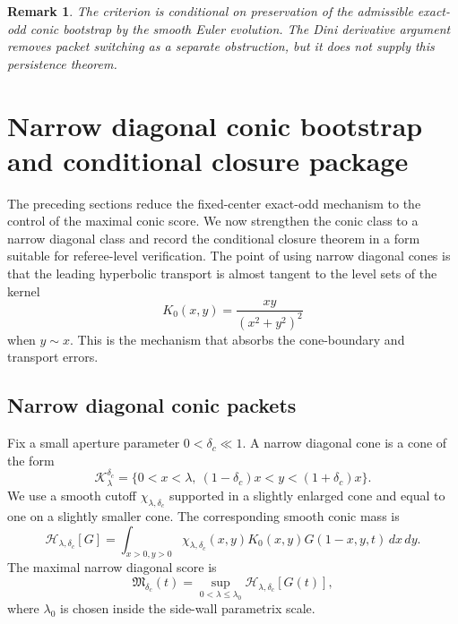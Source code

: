 \documentclass[11pt]{amsart}
\newtheorem{remark}[theorem]{Remark}
\begin{document}
\begin{remark}
The criterion is conditional on preservation of the admissible exact-odd conic bootstrap by the smooth Euler evolution.  The Dini derivative argument removes packet switching as a separate obstruction, but it does not supply this persistence theorem.
\end{remark}


\section{Narrow diagonal conic bootstrap and conditional closure package}\label{sec:finalclosure}

The preceding sections reduce the fixed-center exact-odd mechanism to the control of the maximal conic score.  We now strengthen the conic class to a narrow diagonal class and record the conditional closure theorem in a form suitable for referee-level verification.  The point of using narrow diagonal cones is that the leading hyperbolic transport is almost tangent to the level sets of the kernel
\[
K_0(x,y)=\frac{xy}{(x^2+y^2)^2}
\]
when \(y\sim x\).  This is the mechanism that absorbs the cone-boundary and transport errors.

\subsection{Narrow diagonal conic packets}

Fix a small aperture parameter \(0<\delta_c\ll1\).  A narrow diagonal cone is a cone of the form
\begin{equation}\label{eq:narrow_diag_cone}
\mathcal K_\lambda^{\delta_c}
=
\{0<x<\lambda,\ (1-\delta_c)x<y<(1+\delta_c)x\}.
\end{equation}
We use a smooth cutoff \(\chi_{\lambda,\delta_c}\) supported in a slightly enlarged cone and equal to one on a slightly smaller cone.  The corresponding smooth conic mass is
\begin{equation}\label{eq:smooth_diag_mass}
\mathcal H_{\lambda,\delta_c}[G]
=
\int_{x>0,y>0}\chi_{\lambda,\delta_c}(x,y)
K_0(x,y)G(1-x,y,t)\,dx\,dy.
\end{equation}
The maximal narrow diagonal score is
\begin{equation}\label{eq:narrow_diag_score}
\mathfrak M_{\delta_c}(t)
=
\sup_{0<\lambda\le\lambda_0}\mathcal H_{\lambda,\delta_c}[G(t)],
\end{equation}
where \(\lambda_0\) is chosen inside the side-wall parametrix scale.
\end{document}
